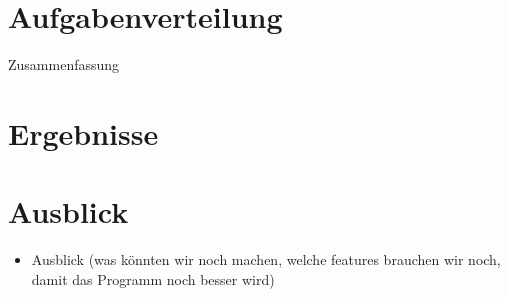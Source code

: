 \section{Aufgabenverteilung}

Zusammenfassung


\section{Ergebnisse}


\section{Ausblick}
\begin{itemize}
\item Ausblick (was könnten wir noch machen, welche features brauchen wir
noch, damit das Programm noch besser wird)
\end{itemize}

